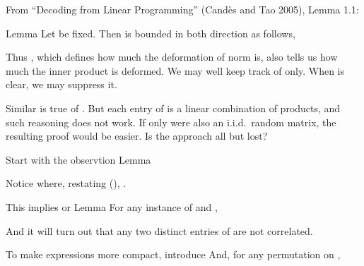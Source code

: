 From ``Decoding from Linear Programming'' (Cand\`es and Tao 2005), Lemma 1.1:

\Result
{Lemma}
{
Let  be fixed.
Then  is bounded in both direction as follows,
}

Thus , which defines how much the deformation of norm is, also tells us how much the inner product is deformed.
We may well keep track of  only.
When  is clear, we may suppress it.

Similar is true of .
But each entry of  is a linear combination of products, and such reasoning does not work.
If only  were also an i.i.d.\ random matrix, the resulting proof would be easier.
Is the approach all but lost?


Start with the observtion
\Result
{Lemma}
{
}

Notice
where, restating (), .

This implies
or
\Result
{Lemma}
{
For any instance of  and ,
}

And it will turn out that any two distinct entries of  are not correlated.

To make expressions more compact, introduce
And, for any permutation \m {\s} on ,

